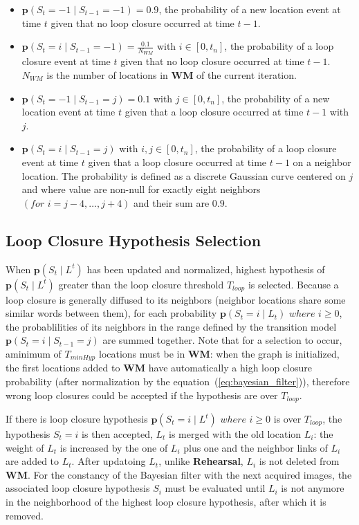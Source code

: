 \begin{itemize}
    \item $\mathbf{p}(S_t=-1 \mid S_{t-1}=-1) =0.9$, the probability of a new location event at time $t$ given that no loop closure occurred at time $t-1$.
    \item $\mathbf{p}(S_t=i \mid S_{t-1}=-1) = \frac{0.1}{N_{WM}}$ with $i \in [0, t_n]$, the probability of a loop closure event at time $t$ given that no loop closure occurred at time $t-1$. $N_{WM}$ is the number of locations in \textbf{WM} of the current iteration.

    \item $\mathbf{p}(S_t=-1 \mid S_{t-1}=j) = 0.1$ with $j \in [0, t_n]$, the probability of a new location event at time $t$ given that a loop closure occurred at time $t-1$ with $j$.
    \item $\mathbf{p}(S_t=i \mid S_{t-1}=j)$ with $i, j \in [0, t_n]$, the probability of a loop closure event at time $t$ given that a loop closure occurred at time $t-1$ on a neighbor location. The probability is defined as a discrete Gaussian curve centered on $j$ and where value are non-null for exactly eight neighbors $(for \,\, i=j-4, \ldots, j+4)$ and their sum are $0.9$.
\end{itemize}

\subsection{Loop Closure Hypothesis Selection}
\label{sec:loop_closure_hypothesis_selection}
When $\mathbf{p}(S_t \mid L^t)$ has been updated and normalized, highest hypothesis of $\mathbf{p}(S_t \mid L^t)$ greater than the loop closure threshold $T_{loop}$ is selected. Because a loop closure is generally diffused to its neighbors (neighbor locations share some similar words between them), for each probability $\mathbf{p}(S_t=i \mid L_t) \,\, where \,\, i \ge 0$, the probablilities of its neighbors in the range defined by the transition model $\mathbf{p}(S_t=i \mid S_{t-1}=j)$ are summed together. Note that for a selection to occur, aminimum of $T_{minHyp}$ locations must be in \textbf{WM}: when the graph is initialized, the first locations added to \textbf{WM} have automatically a high loop closure probability (after normalization by the equation~(\ref{eq:bayesian_filter})), therefore wrong loop closures could be accepted if the hypothesis are over $T_{loop}$.

If there is loop closure hypothesis $\mathbf{p}(S_t=i \mid L^t) \,\, where \,\, i \ge 0$ is over $T_{loop}$, the hypothesis $S_t=i$ is then accepted, $L_t$ is merged with the old location $L_i$: the weight of $L_t$ is increased by the one of $L_i$ plus one and the neighbor links of $L_i$ are added to $L_t$. After updatoing $L_t$, unlike \textbf{Rehearsal}, $L_i$ is not deleted from \textbf{WM}. For the constancy of the Bayesian filter with the next acquired images, the associated loop closure hypothesis $S_i$ must be evaluated until $L_i$ is not anymore in the neighborhood of the highest loop closure hypothesis, after which it is removed. 


